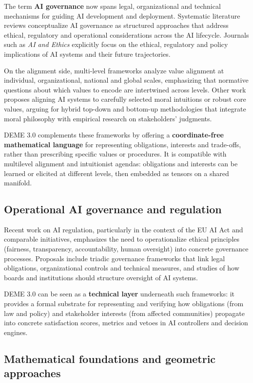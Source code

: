 \documentclass[12pt]{article}
\theoremstyle{remark}
\begin{document}
The term \textbf{AI governance} now spans legal, organizational and technical mechanisms for guiding AI development and deployment. Systematic literature reviews conceptualize AI governance as structured approaches that address ethical, regulatory and operational considerations across the AI lifecycle. Journals such as \emph{AI and Ethics} explicitly focus on the ethical, regulatory and policy implications of AI systems and their future trajectories.

On the alignment side, multi-level frameworks analyze value alignment at individual, organizational, national and global scales, emphasizing that normative questions about which values to encode are intertwined across levels. Other work proposes aligning AI systems to carefully selected moral intuitions or robust core values, arguing for hybrid top-down and bottom-up methodologies that integrate moral philosophy with empirical research on stakeholders' judgments.

DEME 3.0 complements these frameworks by offering a \textbf{coordinate-free mathematical language} for representing obligations, interests and trade-offs, rather than prescribing specific values or procedures. It is compatible with multilevel alignment and intuitionist agendas: obligations and interests can be learned or elicited at different levels, then embedded as tensors on a shared manifold.

\subsection{Operational AI governance and regulation}

Recent work on AI regulation, particularly in the context of the EU AI Act and comparable initiatives, emphasizes the need to operationalize ethical principles (fairness, transparency, accountability, human oversight) into concrete governance processes. Proposals include triadic governance frameworks that link legal obligations, organizational controls and technical measures, and studies of how boards and institutions should structure oversight of AI systems.

DEME 3.0 can be seen as a \textbf{technical layer} underneath such frameworks: it provides a formal substrate for representing and verifying how obligations (from law and policy) and stakeholder interests (from affected communities) propagate into concrete satisfaction scores, metrics and vetoes in AI controllers and decision engines.

\subsection{Mathematical foundations and geometric approaches}
\end{document}
